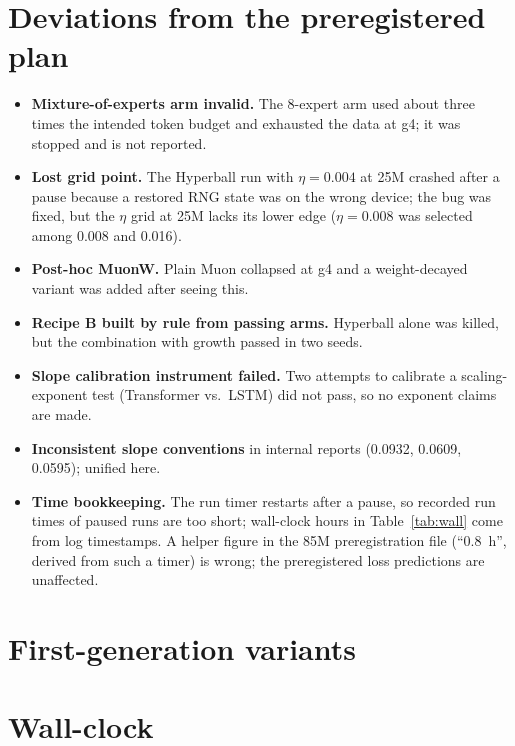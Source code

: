 \documentclass[11pt]{article}
\begin{document}
\section{Deviations from the preregistered plan}\label{app:dev}
\begin{itemize}\itemsep0pt
\item \textbf{Mixture-of-experts arm invalid.} The 8-expert arm used about three times the intended token budget and exhausted the data at g4; it was stopped and is not reported.
\item \textbf{Lost grid point.} The Hyperball run with $\eta=0.004$ at 25M crashed after a pause because a restored RNG state was on the wrong device; the bug was fixed, but the $\eta$ grid at 25M lacks its lower edge ($\eta=0.008$ was selected among 0.008 and 0.016).
\item \textbf{Post-hoc MuonW.} Plain Muon collapsed at g4 and a weight-decayed variant was added after seeing this.
\item \textbf{Recipe B built by rule from passing arms.} Hyperball alone was killed, but the combination with growth passed in two seeds.
\item \textbf{Slope calibration instrument failed.} Two attempts to calibrate a scaling-exponent test (Transformer vs.\ LSTM) did not pass, so no exponent claims are made.
\item \textbf{Inconsistent slope conventions} in internal reports (0.0932, 0.0609, 0.0595); unified here.
\item \textbf{Time bookkeeping.} The run timer restarts after a pause, so recorded run times of paused runs are too short; wall-clock hours in Table~\ref{tab:wall} come from log timestamps. A helper figure in the 85M preregistration file (``0.8~h'', derived from such a timer) is wrong; the preregistered loss predictions are unaffected.
\end{itemize}

\section{First-generation variants}

\section{Wall-clock}

\end{document}
